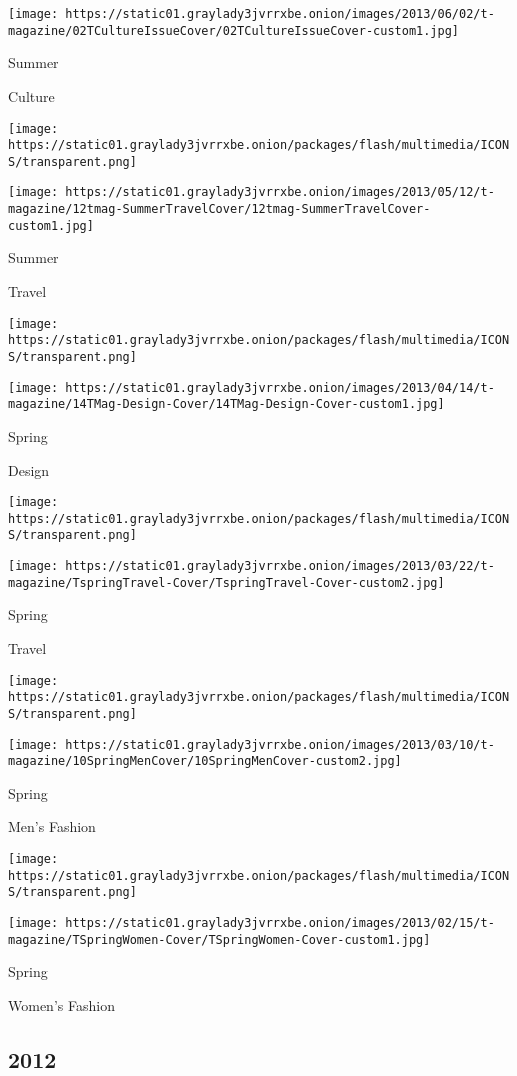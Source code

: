 \texttt{[image: https://static01.graylady3jvrrxbe.onion/images/2013/06/02/t-magazine/02TCultureIssueCover/02TCultureIssueCover-custom1.jpg]}

Summer

Culture

\texttt{[image: https://static01.graylady3jvrrxbe.onion/packages/flash/multimedia/ICONS/transparent.png]}

\texttt{[image: https://static01.graylady3jvrrxbe.onion/images/2013/05/12/t-magazine/12tmag-SummerTravelCover/12tmag-SummerTravelCover-custom1.jpg]}

Summer

Travel

\texttt{[image: https://static01.graylady3jvrrxbe.onion/packages/flash/multimedia/ICONS/transparent.png]}

\texttt{[image: https://static01.graylady3jvrrxbe.onion/images/2013/04/14/t-magazine/14TMag-Design-Cover/14TMag-Design-Cover-custom1.jpg]}

Spring

Design

\texttt{[image: https://static01.graylady3jvrrxbe.onion/packages/flash/multimedia/ICONS/transparent.png]}

\texttt{[image: https://static01.graylady3jvrrxbe.onion/images/2013/03/22/t-magazine/TspringTravel-Cover/TspringTravel-Cover-custom2.jpg]}

Spring

Travel

\texttt{[image: https://static01.graylady3jvrrxbe.onion/packages/flash/multimedia/ICONS/transparent.png]}

\texttt{[image: https://static01.graylady3jvrrxbe.onion/images/2013/03/10/t-magazine/10SpringMenCover/10SpringMenCover-custom2.jpg]}

Spring

Men's Fashion

\texttt{[image: https://static01.graylady3jvrrxbe.onion/packages/flash/multimedia/ICONS/transparent.png]}

\texttt{[image: https://static01.graylady3jvrrxbe.onion/images/2013/02/15/t-magazine/TSpringWomen-Cover/TSpringWomen-Cover-custom1.jpg]}

Spring

Women's Fashion

\hypertarget{2012}{%
\subsection{2012}\label{2012}}

